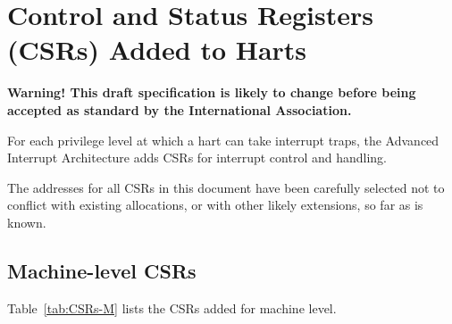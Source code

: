 
\chapter{Control and Status Registers (CSRs) Added to Harts}
\label{ch:CSRs}

\textbf{%
Warning!
This draft specification is likely to change before being accepted as
standard by the {\RISCV} International Association.%
}
\bigskip

For each privilege level at which a {\RISCV} hart can take interrupt
traps, the Advanced Interrupt Architecture adds CSRs for interrupt
control and handling.

\begin{commentary}
The addresses for all CSRs in this document have been carefully
selected not to conflict with existing allocations, or with other
likely extensions, so far as is known.
\end{commentary}

\section{Machine-level CSRs}

Table~\ref{tab:CSRs-M} lists the CSRs added for machine level.

